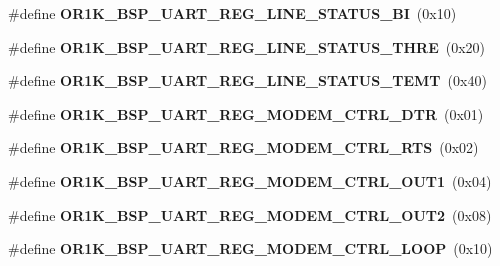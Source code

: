 \begin{DoxyCompactItemize}
\#define {\bfseries O\+R1\+K\+\_\+\+B\+S\+P\+\_\+\+U\+A\+R\+T\+\_\+\+R\+E\+G\+\_\+\+L\+I\+N\+E\+\_\+\+S\+T\+A\+T\+U\+S\+\_\+\+BI}~(0x10)
\item 
\mbox{\label{group__generic__or1k__reg_ga66e234fc73bc43acf321de9fc34f595a}} 
\#define {\bfseries O\+R1\+K\+\_\+\+B\+S\+P\+\_\+\+U\+A\+R\+T\+\_\+\+R\+E\+G\+\_\+\+L\+I\+N\+E\+\_\+\+S\+T\+A\+T\+U\+S\+\_\+\+T\+H\+RE}~(0x20)
\item 
\mbox{\label{group__generic__or1k__reg_ga441ad2e46ffaf8b1611ae0509f3ff4e7}} 
\#define {\bfseries O\+R1\+K\+\_\+\+B\+S\+P\+\_\+\+U\+A\+R\+T\+\_\+\+R\+E\+G\+\_\+\+L\+I\+N\+E\+\_\+\+S\+T\+A\+T\+U\+S\+\_\+\+T\+E\+MT}~(0x40)
\item 
\mbox{\label{group__generic__or1k__reg_ga69b75ffbdec87fca2105bff4e4c87587}} 
\#define {\bfseries O\+R1\+K\+\_\+\+B\+S\+P\+\_\+\+U\+A\+R\+T\+\_\+\+R\+E\+G\+\_\+\+M\+O\+D\+E\+M\+\_\+\+C\+T\+R\+L\+\_\+\+D\+TR}~(0x01)
\item 
\mbox{\label{group__generic__or1k__reg_ga9f41306fae828bb995415237c1a15126}} 
\#define {\bfseries O\+R1\+K\+\_\+\+B\+S\+P\+\_\+\+U\+A\+R\+T\+\_\+\+R\+E\+G\+\_\+\+M\+O\+D\+E\+M\+\_\+\+C\+T\+R\+L\+\_\+\+R\+TS}~(0x02)
\item 
\mbox{\label{group__generic__or1k__reg_ga735f8c11510b66c0414619b54e7918e9}} 
\#define {\bfseries O\+R1\+K\+\_\+\+B\+S\+P\+\_\+\+U\+A\+R\+T\+\_\+\+R\+E\+G\+\_\+\+M\+O\+D\+E\+M\+\_\+\+C\+T\+R\+L\+\_\+\+O\+U\+T1}~(0x04)
\item 
\mbox{\label{group__generic__or1k__reg_ga094480e89ed2c275ed2d28c5ad505562}} 
\#define {\bfseries O\+R1\+K\+\_\+\+B\+S\+P\+\_\+\+U\+A\+R\+T\+\_\+\+R\+E\+G\+\_\+\+M\+O\+D\+E\+M\+\_\+\+C\+T\+R\+L\+\_\+\+O\+U\+T2}~(0x08)
\item 
\mbox{\label{group__generic__or1k__reg_gacec284433235cad5329213fcc9cbffc9}} 
\#define {\bfseries O\+R1\+K\+\_\+\+B\+S\+P\+\_\+\+U\+A\+R\+T\+\_\+\+R\+E\+G\+\_\+\+M\+O\+D\+E\+M\+\_\+\+C\+T\+R\+L\+\_\+\+L\+O\+OP}~(0x10)
\item 
\mbox{\label{group__generic__or1k__reg_ga085aa6e74d9ff90b21632fb3e3085ae2}} 

\end{DoxyCompactItemize}
